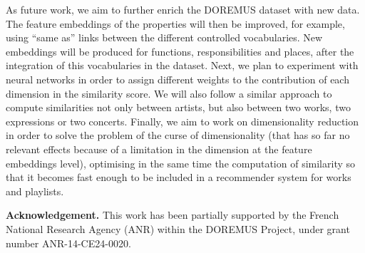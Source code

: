 \documentclass{article}
\begin{document}
As future work, we aim to further enrich the DOREMUS dataset with new data. The feature embeddings of the properties will then be improved, for example, using ``same as'' links between the different controlled vocabularies. New embeddings will be produced for functions, responsibilities and places, after the integration of this vocabularies in the dataset. Next, we plan to experiment with neural networks in order to assign different weights to the contribution of each dimension in the similarity score. We will also follow a similar approach to compute similarities not only between artists, but also between two works, two expressions or two concerts. Finally, we aim to work on dimensionality reduction in order to solve the problem of the curse of dimensionality (that has so far no relevant effects because of a limitation in the dimension at the feature embeddings level), optimising in the same time the computation of similarity so that it becomes fast enough to be included in a recommender system for works and playlists.

\vspace{2mm} 
\noindent
\textbf{Acknowledgement.}
This work has been partially supported by the French National Research Agency (ANR) within the DOREMUS Project, under grant number ANR-14-CE24-0020.


\end{document}
